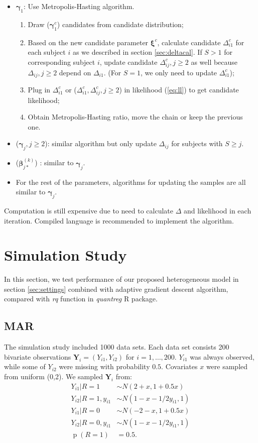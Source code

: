 \documentclass[12pt]{article}
\DeclareMathOperator{\pr}{p}
\begin{document}
\begin{itemize}
\item $\bm \gamma_{1} $: Use Metropolis-Hasting algorithm.
  \begin{enumerate}
  \item Draw ($\bm \gamma_{1}^c$) candidates from candidate
    distribution;
  \item Based on the new candidate parameter $\bm \xi^c$, calculate
    candidate $\Delta_{i1}^c$ for each subject $i$ as we described in
    section \ref{sec:deltacal}. If $S > 1$ for corresponding subject
    $i$, update candidate $\Delta_{ij}^c, j \geq 2$ as well because
    $\Delta_{ij}, j \geq 2$ depend on $\Delta_{i1}$. (For $S = 1$, we
    only need to update $\Delta_{i1}^c$);
  \item Plug in $\Delta_{i1}^c$ or ($\Delta_{i1}^c, \Delta_{ij}^c, j
    \geq 2$) in likelihood (\ref{eq:ll}) to get candidate likelihood;
  \item Obtain Metropolis-Hasting ratio, move the chain or keep the
    previous one.
  \end{enumerate}
\item ($ \bm \gamma_j , j \geq 2$): similar algorithm but only update
  $\Delta_{ij}$ for subjects with $S \geq j$.
\item ($ \bm \beta_{j*}^{(k)}$) : similar to $ \bm \gamma_j$.
\item For the rest of the parameters, algorithms for updating the
  samples are all similar to $\bm \gamma_j$.
\end{itemize}

Computation is still expensive due to need to calculate $\Delta$ and
likelihood in each iteration. Compiled language is recommended to
implement the algorithm.

\section{Simulation Study}
\label{sec:simulation}
In this section, we test performance of our proposed heterogeneous
model in section \ref{sec:settings} combined with adaptive gradient
descent algorithm, compared with \textit{rq} function in
\textit{quantreg} R package.

\subsection{MAR}

The simulation study included 1000 data sets. Each data set consists
200 bivariate observations $\bm Y_i = (Y_{i1}, Y_{i2})$ for $i = 1,
\ldots, 200$. $Y_{i1}$ was always observed, while some of $Y_{i2}$
were missing with probability $0.5$. Covariates $x$ were sampled from
uniform (0,2). We sampled $\bm Y_i$ from:
\begin{align*}
  Y_{i1} |R = 1 & \sim N ( 2 + x, 1 + 0.5x)\\
  Y_{i2} | R = 1, y_{i1} & \sim N(1 - x - 1/2y_{i1}, 1) \\
  Y_{i1}| R= 0 & \sim N(-2 - x, 1 + 0.5x) \\
  Y_{i2}| R= 0, y_{i1} & \sim N(1 - x - 1/2y_{i1}, 1) \\
  \pr (R = 1) & = 0.5.
\end{align*}
\end{document}
